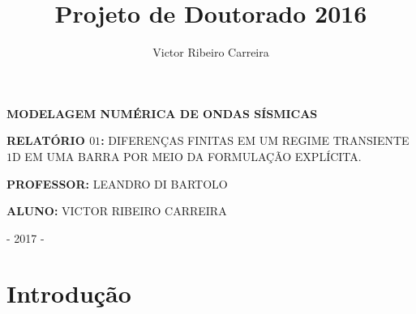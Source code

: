 \documentclass[12pt,a4paper,final]{report}%
\author{Victor Ribeiro Carreira}
\title{Projeto de Doutorado 2016}
\begin{document}
\thispagestyle{empty}%


\begin{figure}[H]
\centering
{}
\end{figure}

\vspace{1cm}

\begin{center}
\textbf{MODELAGEM NUMÉRICA DE ONDAS SÍSMICAS}
\end{center}

\vspace{3cm}

\begin{center}
\textbf{RELATÓRIO $01$:} DIFERENÇAS FINITAS EM UM REGIME TRANSIENTE $1$D EM UMA BARRA POR MEIO DA FORMULAÇÃO EXPLÍCITA.
\end{center}

\vspace{2.5cm}

\begin{center}
\textbf{PROFESSOR:} LEANDRO DI BARTOLO
\end{center}

\begin{center}
\textbf{ALUNO:} VICTOR RIBEIRO CARREIRA
\end{center}

\vspace{10cm}

\begin{center}
- 2017 -
\end{center}



\pagebreak%
\section*{Introdução}
\end{document}
